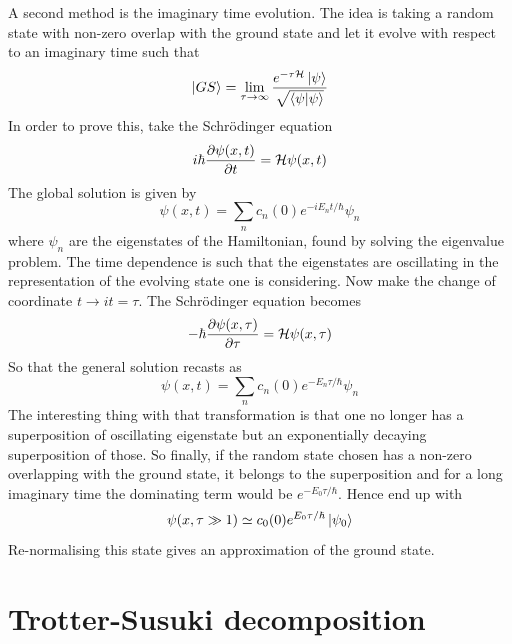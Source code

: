         A second method is the imaginary time evolution. The idea is taking a random state with non-zero overlap with the ground state and let it evolve with respect to an imaginary time such that
        \begin{equation}
            \ket{GS} = \lim_{\tau \rightarrow \infty}\frac{e^{-\tau \mathcal H}\ket{\psi}}{\sqrt{\bra{\psi}\ket{\psi}}}
        \end{equation}
        In order to prove this, take the Schrödinger equation
        \begin{equation}
            i\hbar\frac{\partial\psi(x,t)}{\partial t} = \mathcal H\psi(x,t)
        \end{equation}
        The global solution is given by
        \begin{equation}
            \psi(x,t) = \sum_n c_n(0)e^{-iE_nt/\hbar}\psi_n
        \end{equation}
        where $\psi_n$ are the eigenstates of the Hamiltonian, found by solving the eigenvalue problem. The time dependence is such that the eigenstates are oscillating in the representation of the evolving state one is considering. Now make the change of coordinate $t\rightarrow it = \tau$. The Schrödinger equation becomes
        \begin{equation}
            -\hbar\frac{\partial\psi(x,\tau)}{\partial \tau} = \mathcal H\psi(x,\tau)
        \end{equation}
        So that the general solution recasts as
        \begin{equation}
            \psi(x,t) = \sum_n c_n(0)e^{-E_n\tau/\hbar}\psi_n
        \end{equation}
        The interesting thing with that transformation is that one no longer has a superposition of oscillating eigenstate but an exponentially decaying superposition of those. So finally, if the random state chosen has a non-zero overlapping with the ground state, it belongs to the superposition and for a long imaginary time the dominating term would be $e^{-E_0\tau/\hbar}$. Hence end up with
        \begin{equation}
            \psi(x,\tau \gg 1) \simeq c_0(0)e^{E_0\tau/\hbar}\ket{\psi_0}
        \end{equation} 
        Re-normalising this state gives an approximation of the ground state.

    \section{Trotter-Susuki decomposition}

